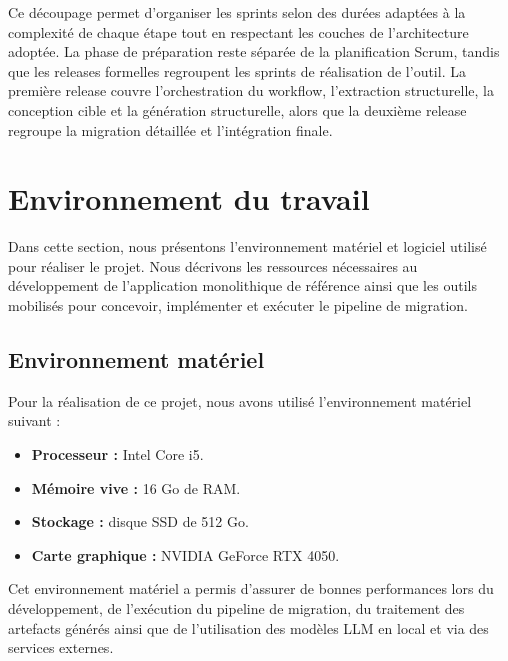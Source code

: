 Ce découpage permet d'organiser les sprints selon des durées adaptées à la complexité de chaque étape tout en respectant les couches de l'architecture adoptée. La phase de préparation reste séparée de la planification Scrum, tandis que les releases formelles regroupent les sprints de réalisation de l'outil. La première release couvre l'orchestration du workflow, l'extraction structurelle, la conception cible et la génération structurelle, alors que la deuxième release regroupe la migration détaillée et l'intégration finale.

\newcommand{\toolentry}[3]{%
\noindent\parbox[t]{\textwidth}{\textbf{#1}~\cite{#2} : #3}\par\vspace{0.45em}}

\section{Environnement du travail}

Dans cette section, nous présentons l'environnement matériel et logiciel utilisé pour réaliser le projet. Nous décrivons les ressources nécessaires au développement de l'application monolithique de référence ainsi que les outils mobilisés pour concevoir, implémenter et exécuter le pipeline de migration.

\subsection{Environnement matériel}

Pour la réalisation de ce projet, nous avons utilisé l'environnement matériel suivant :

\begin{itemize}
    \item \textbf{Processeur :} Intel Core i5.
    \item \textbf{Mémoire vive :} 16 Go de RAM.
    \item \textbf{Stockage :} disque SSD de 512 Go.
    \item \textbf{Carte graphique :} NVIDIA GeForce RTX 4050.
\end{itemize}

Cet environnement matériel a permis d'assurer de bonnes performances lors du développement, de l'exécution du pipeline de migration, du traitement des artefacts générés ainsi que de l'utilisation des modèles LLM en local et via des services externes.

